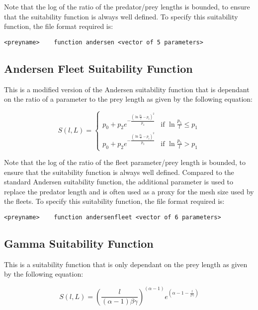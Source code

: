 \documentclass[10pt,twoside]{book}
\begin{document}
Note that the log of the ratio of the predator/prey lengths is bounded, to ensure that the suitability function is always well defined.  To specify this suitability function, the file format required is:

{\small\begin{verbatim}
<preyname>    function andersen <vector of 5 parameters>
\end{verbatim}}

\subsection{Andersen Fleet Suitability Function}
This is a modified version of the Andersen suitability function that is dependant on the ratio of a parameter to the prey length as given by the following equation:

\begin{equation}\label{eq:andersenfleetsuit}
S(l, L) =
\begin{cases}
p_0 + p_2e^{-\frac{(\ln\frac{p_5}{l} - p_1)^2}{p_4}} & \textrm{if $\ln\frac{p_5}{l} \leq p_1$} \\
p_0 + p_2e^{-\frac{(\ln\frac{p_5}{l} - p_1)^2}{p_3}} & \textrm{if $\ln\frac{p_5}{l} > p_1$}
\end{cases}
\end{equation}

Note that the log of the ratio of the fleet parameter/prey length is bounded, to ensure that the suitability function is always well defined.  Compared to the standard Andersen suitability function, the additional parameter is used to replace the predator length and is often used as a proxy for the mesh size used by the fleets.  To specify this suitability function, the file format required is:

{\small\begin{verbatim}
<preyname>    function andersenfleet <vector of 6 parameters>
\end{verbatim}}

\subsection{Gamma Suitability Function}
This is a suitability function that is only dependant on the prey length as given by the following equation:

\begin{equation}\label{eq:gammasuit}
S(l, L) = \left(\frac{l}{(\alpha - 1) \beta\gamma}\right) ^ {(\alpha - 1)}e ^ {(\alpha - 1 - \frac{l}{\beta\gamma})}
\end{equation}
\end{document}
